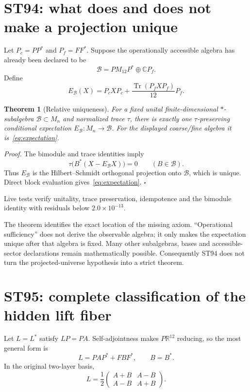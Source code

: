 \documentclass[11pt,a4paper]{article}
\newtheorem{theorem}{Theorem}[section]
\begin{document}
\section{ST94: what does and does not make a projection unique}

Let $P_c=PP^*$ and $P_f=FF^*$. Suppose the operationally accessible algebra has already been declared to be
\[
\mathcal B=P M_{12}P^*\oplus\mathbb C P_f.
\]
Define
\begin{equation}
E_{\mathcal B}(X)=P_cXP_c+\frac{\operatorname{Tr}(P_fXP_f)}{12}P_f.
\label{eq:expectation}
\end{equation}

\begin{theorem}[Relative uniqueness]
For a fixed unital finite-dimensional $*$-subalgebra $\mathcal B\subset M_n$ and normalized trace $\tau$, there is exactly one $\tau$-preserving conditional expectation $E_{\mathcal B}:M_n\to\mathcal B$. For the displayed coarse/fine algebra it is~\eqref{eq:expectation}.
\end{theorem}

\textit{Proof.} The bimodule and trace identities imply
\[
\tau\bigl(B^*(X-E_{\mathcal B}X)\bigr)=0\qquad(B\in\mathcal B).
\]
Thus $E_{\mathcal B}$ is the Hilbert--Schmidt orthogonal projection onto $\mathcal B$, which is unique. Direct block evaluation gives~\eqref{eq:expectation}. \hfill$\square$

Live tests verify unitality, trace preservation, idempotence and the bimodule identity with residuals below $2.0\times10^{-13}$.

The theorem identifies the exact location of the missing axiom. ``Operational sufficiency'' does not derive the observable algebra; it only makes the expectation unique after that algebra is fixed. Many other subalgebras, bases and accessible-sector declarations remain mathematically possible. Consequently ST94 does not turn the projected-universe hypothesis into a strict theorem.

\section{ST95: complete classification of the hidden lift fiber}

Let $L=L^*$ satisfy $LP=PA$. Self-adjointness makes $P\mathbb R^{12}$ reducing, so the most general form is
\begin{equation}
L=PAP^*+FBF^*,\qquad B=B^*.
\label{eq:fiber}
\end{equation}
In the original two-layer basis,
\[
L=\frac12\begin{pmatrix}A+B&A-B\\A-B&A+B\end{pmatrix}.
\]
\end{document}
